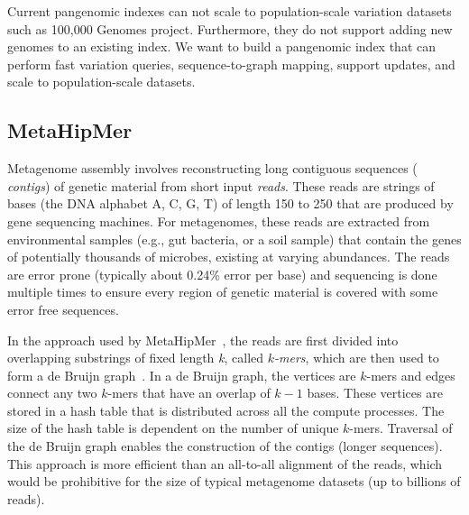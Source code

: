 \begin{rproblem}
Current pangenomic indexes can not scale to population-scale variation datasets such as 100,000 Genomes project. Furthermore, they do not support adding new genomes to an existing index. We want to build a pangenomic index that can perform fast variation queries, sequence-to-graph mapping, support updates, and scale to population-scale datasets.
\label{rprob:peppermint3}
\end{rproblem}



\subsection{MetaHipMer}

Metagenome assembly involves reconstructing long contiguous sequences ({\it
contigs}) of genetic material from short input {\it reads}. These reads are
strings of bases (the DNA alphabet A, C, G, T) of length 150 to 250 that are
produced by gene sequencing machines.  For metagenomes, these reads are
extracted from environmental samples (e.g., gut bacteria, or a soil sample) that
contain the genes of potentially thousands of microbes, existing at varying
abundances.  The reads are error prone (typically about 0.24\% error per base)
and sequencing is done multiple times to ensure every region of genetic material
is covered with some error free sequences.

In the approach used by MetaHipMer~\cite{GeorganasEHG18,HofmeyrEGC20}, the reads are first divided into overlapping
substrings of fixed length {\it k}, called {\it $k$-mers}, which are then used
to form a de Bruijn graph~\cite{CompeauPeTe11}. In a de Bruijn graph, the
vertices are $k$-mers and edges connect any two $k$-mers that have an overlap of
$k-1$ bases. These vertices are stored in a hash table that is distributed
across all the compute processes.  The size of the hash table is dependent on
the number of unique $k$-mers.  Traversal of the de Bruijn graph enables the
construction of the contigs (longer sequences).  This approach is more efficient
than an all-to-all alignment of the reads, which would be prohibitive for the
size of typical metagenome datasets (up to billions of reads).

